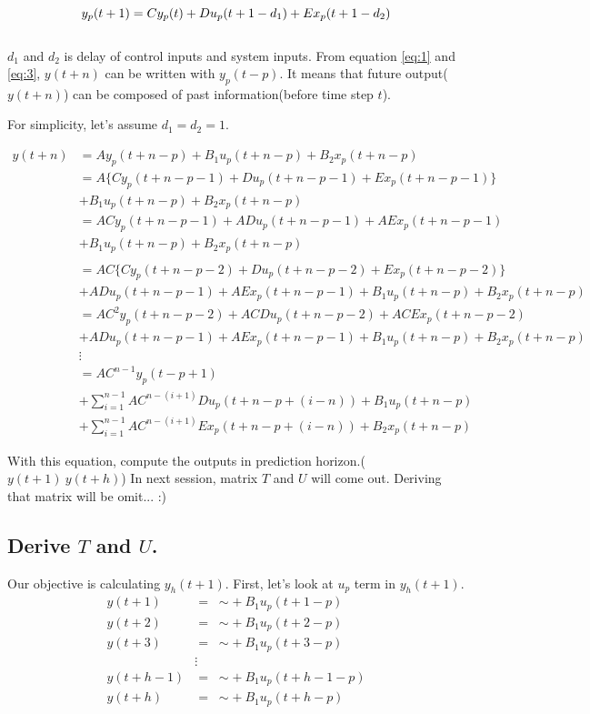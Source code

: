 \documentclass{article}
\begin{document}
\begin{equation} \label{eq:3}
\\
	y_p(t+1) = Cy_p(t) + Du_p(t+1-d_1) + Ex_p(t+1-d_2)
\end{equation}
\\

$d_1$ and $d_2$ is delay of control inputs and system inputs. From equation \eqref{eq:1} and \eqref{eq:3}, $y(t+n)$ can be written with $y_p(t-p)$. It means that future output($y(t+n)$) can be composed of past information(before time step $t$). 


For simplicity, let's assume $d_1 = d_2 = 1$.

\begin{align*}
	y(t+n) &= Ay_p(t+n-p) + B_1u_p(t+n-p) + B_2x_p(t+n-p)\\
	&= A\{Cy_p(t+n-p-1) + Du_p(t+n-p-1) + Ex_p(t+n-p-1)\}\\
	&+ B_1u_p(t+n-p) + B_2x_p(t+n-p)\\
	&= ACy_p(t+n-p-1) + ADu_p(t+n-p-1) + AEx_p(t+n-p-1)\\
	&+ B_1u_p(t+n-p) + B_2x_p(t+n-p)\\\\
	&=AC\{Cy_p(t+n-p-2) + Du_p(t+n-p-2) + Ex_p(t+n-p-2)\}\\
	& + ADu_p(t+n-p-1) + AEx_p(t+n-p-1) + B_1u_p(t+n-p) 
	+ B_2x_p(t+n-p)\\
	&=AC^2y_p(t+n-p-2) + ACDu_p(t+n-p-2) + ACEx_p(t+n-p-2)\\
	& + ADu_p(t+n-p-1) + AEx_p(t+n-p-1) + B_1u_p(t+n-p) 
	+ B_2x_p(t+n-p)\\
	& \vdots\\
	&= AC^{n-1}y_p(t-p+1)\\
	&+ \sum_{i=1}^{n-1} AC^{n-(i+1)}Du_p(t+n-p+(i-n)) + B_1u_p(t+n-p)\\
	&+ \sum_{i=1}^{n-1} AC^{n-(i+1)}Ex_p(t+n-p+(i-n))+ B_2x_p(t+n-p)
\end{align*}




With this equation, compute the outputs in prediction horizon.($y(t+1) ~ y(t+h)$)
 In next session, matrix $T$ and $U$ will come out. Deriving that matrix will be omit... :)

\subsection{Derive $T$ and $U$.}

Our objective is calculating $y_h(t+1)$. First, let's look at $u_p$ term in $y_h(t+1)$.
\begin{align*}
	y(t+1) & =\;  \sim + \:B_1u_p(t+1-p)\\
	y(t+2) & =\;  \sim + \:B_1u_p(t+2-p)\\
	y(t+3) & =\;  \sim + \:B_1u_p(t+3-p)\\
		   & \vdots\\
	y(t+h-1) &= \;  \sim + \:B_1u_p(t+h-1-p)\\
	y(t+h) &= \;  \sim + \:B_1u_p(t+h-p)\\
\end{align*}
\end{document}
